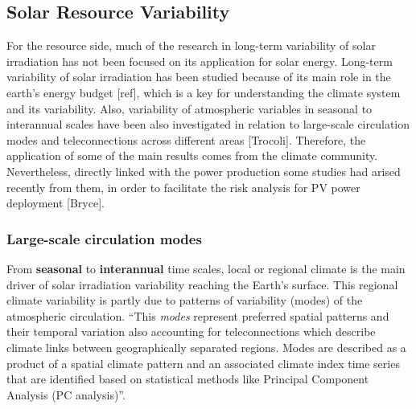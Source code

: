 

\subsection{Solar Resource Variability}

For the resource side, much of the research in long-term variability of solar irradiation has not been focused on its application for solar energy. Long-term variability of solar irradiation has been studied because of its main role in the earth's energy budget [ref], which is a key for understanding the climate system and its variability. Also, variability of atmospheric variables in seasonal to interannual scales have been also investigated in relation to large-scale circulation modes and teleconnections across different areas [Trocoli]. Therefore, the application of some of the main results comes from the climate community. Nevertheless, directly linked with the power production some studies had arised recently from them, in order to facilitate the risk analysis for PV power deployment [Bryce].


\subsubsection{Large-scale circulation modes}

From \textbf{seasonal} to \textbf{interannual} time scales, local or regional climate is the main driver of solar irradiation variability reaching the Earth's surface. This regional climate variability is partly due to patterns of variability (modes) of the atmospheric circulation. ``This \textit{modes} represent preferred spatial patterns and their temporal variation also accounting for teleconnections which describe climate links between geographically separated regions. Modes  are described as a product of a spatial climate pattern and an associated climate index time series that are identified based on statistical methods like Principal Component Analysis (PC analysis)''.


